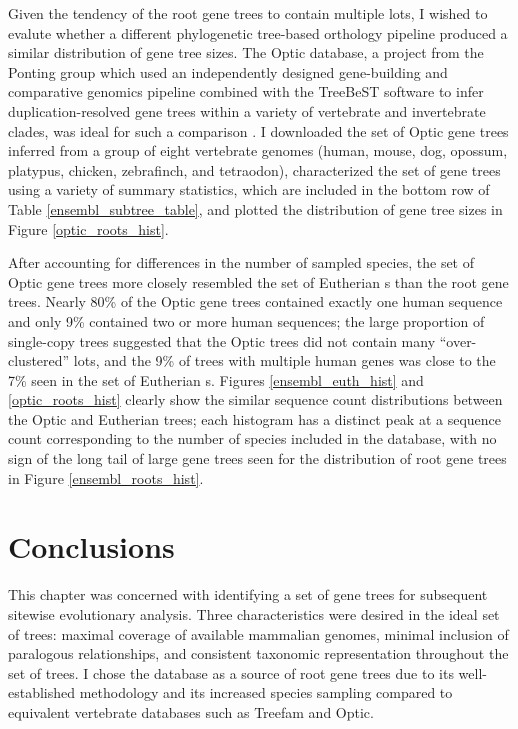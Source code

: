 Given the tendency of the root \cmp gene trees to contain multiple
\mammln \acp{lot}, I wished to evalute whether a different
phylogenetic tree-based orthology pipeline produced a similar
distribution of gene tree sizes. The Optic database, a project from
the Ponting group which used an independently designed gene-building
and comparative genomics pipeline combined with the TreeBeST software
to infer duplication-resolved gene trees within a variety of
vertebrate and invertebrate clades, was ideal for such a comparison
\citep{Heger2008}. I downloaded the set of Optic gene trees inferred
from a group of eight vertebrate genomes (human, mouse, dog, opossum,
platypus, chicken, zebrafinch, and tetraodon), characterized the set
of gene trees using a variety of summary statistics, which are
included in the bottom row of Table \ref{ensembl_subtree_table}, and
plotted the distribution of gene tree sizes in Figure
\ref{optic_roots_hist}.

After accounting for differences in the number of sampled species, the
set of Optic gene trees more closely resembled the set of Eutherian
\subtr{}s than the root \cmp gene trees. Nearly 80\% of the Optic
gene trees contained exactly one human sequence and only 9\% contained
two or more human sequences; the large proportion of single-copy trees
suggested that the Optic trees did not contain many ``over-clustered''
\mammln \acp{lot}, and the 9\% of trees with multiple human genes was
close to the 7\% seen in the set of Eutherian \subtr{}s. Figures
\ref{ensembl_euth_hist} and \ref{optic_roots_hist} clearly show the
similar sequence count distributions between the Optic and Eutherian
trees; each histogram has a distinct peak at a sequence count
corresponding to the number of species included in the database, with
no sign of the long tail of large gene trees seen for the distribution
of root \cmp gene trees in Figure \ref{ensembl_roots_hist}.

\section{Conclusions}

This chapter was concerned with identifying a set of gene trees for
subsequent sitewise evolutionary analysis. Three characteristics were
desired in the ideal set of trees: maximal coverage of available
mammalian genomes, minimal inclusion of paralogous relationships, and
consistent taxonomic representation throughout the set of trees. I
chose the \ens \cmp database as a source of root gene trees due to its
well-established methodology \citep{Heger2008,Vilella2009} and its
increased species sampling compared to equivalent vertebrate databases
such as Treefam and Optic.


